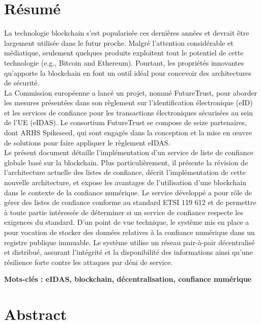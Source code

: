 \documentclass{tnreport}
\begin{document}
\cleardoublepage
\thispagestyle{empty}

\section*{Résumé}

La technologie blockchain s'est popularisée ces dernières années et devrait être largement utilisée dans le futur proche. Malgré l'attention considérable et médiatique, seulement quelques produits exploitent tout le potentiel de cette technologie (e.g., Bitcoin and Ethereum). Pourtant, les propriétés innovantes qu'apporte la blockchain en font un outil idéal pour concevoir des architectures de sécurité.
\\
La Commission européenne a lancé un projet, nommé FutureTrust, pour aborder les mesures présentées dans
son règlement sur l'identification électronique (eID) et les services de confiance pour les transactions électroniques sécurisées au sein de l'UE (eIDAS). Le consortium FutureTrust se compose de seize partenaires, dont ARHS Spikeseed, qui sont engagés dans la conception et la mise en œuvre de solutions pour faire appliquer le règlement eIDAS.
\\
Le présent document détaille l'implémentation d'un service de liste de confiance globale basé sur la blockchain. Plus particulièrement, il présente la révision de l’architecture actuelle des listes de confiance, décrit l'implémentation de cette nouvelle architecture, et expose les avantages de l'utilisation d'une blockchain dans le contexte de la confiance numérique. Le service développé a pour rôle de gérer des listes de confiance conforme au standard ETSI 119 612 et de permettre à toute partie intéressée de déterminer si un service de confiance respecte les exigences du standard. D'un point de vue technique, le système mis en place a pour vocation de stocker des données relatives à la confiance numérique dans un registre publique immuable. Le système utilise un réseau pair-à-pair décentralisé et distribué, assurant l'intégrité et la disponibilité des informations ainsi qu'une résilience forte contre les attaques par déni de service.

{\bf Mots-clés : eIDAS, blockchain, décentralisation, confiance numérique} 


\section*{Abstract}
\end{document}
